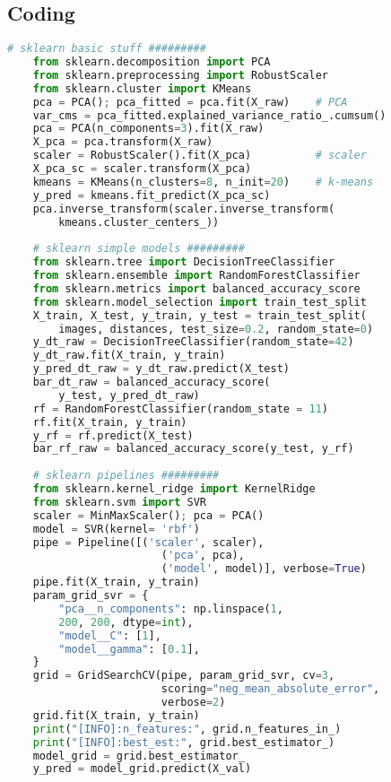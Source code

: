 \subsection{Coding}
{\footnotesize
\begin{lstlisting}[language=Python]
    # sklearn basic stuff #########
    from sklearn.decomposition import PCA
    from sklearn.preprocessing import RobustScaler
    from sklearn.cluster import KMeans
    pca = PCA(); pca_fitted = pca.fit(X_raw)    # PCA
    var_cms = pca_fitted.explained_variance_ratio_.cumsum()
    pca = PCA(n_components=3).fit(X_raw)
    X_pca = pca.transform(X_raw)
    scaler = RobustScaler().fit(X_pca)          # scaler
    X_pca_sc = scaler.transform(X_pca)
    kmeans = KMeans(n_clusters=8, n_init=20)    # k-means
    y_pred = kmeans.fit_predict(X_pca_sc)
    pca.inverse_transform(scaler.inverse_transform(
        kmeans.cluster_centers_))
    
    # sklearn simple models #########
    from sklearn.tree import DecisionTreeClassifier
    from sklearn.ensemble import RandomForestClassifier
    from sklearn.metrics import balanced_accuracy_score
    from sklearn.model_selection import train_test_split
    X_train, X_test, y_train, y_test = train_test_split(
        images, distances, test_size=0.2, random_state=0)
    y_dt_raw = DecisionTreeClassifier(random_state=42)  
    y_dt_raw.fit(X_train, y_train)
    y_pred_dt_raw = y_dt_raw.predict(X_test)
    bar_dt_raw = balanced_accuracy_score(
        y_test, y_pred_dt_raw)
    rf = RandomForestClassifier(random_state = 11)      
    rf.fit(X_train, y_train)
    y_rf = rf.predict(X_test)
    bar_rf_raw = balanced_accuracy_score(y_test, y_rf)
    
    # sklearn pipelines #########
    from sklearn.kernel_ridge import KernelRidge
    from sklearn.svm import SVR
    scaler = MinMaxScaler(); pca = PCA()
    model = SVR(kernel= 'rbf')
    pipe = Pipeline([('scaler', scaler),
                        ('pca', pca),
                        ('model', model)], verbose=True)
    pipe.fit(X_train, y_train)
    param_grid_svr = {
        "pca__n_components": np.linspace(1, 
        200, 200, dtype=int),
        "model__C": [1],
        "model__gamma": [0.1],
    }
    grid = GridSearchCV(pipe, param_grid_svr, cv=3, 
                        scoring="neg_mean_absolute_error", 
                        verbose=2)
    grid.fit(X_train, y_train) 
    print("[INFO]:n_features:", grid.n_features_in_)
    print("[INFO]:best_est:", grid.best_estimator_)
    model_grid = grid.best_estimator_
    y_pred = model_grid.predict(X_val)
    

\end{lstlisting}}
